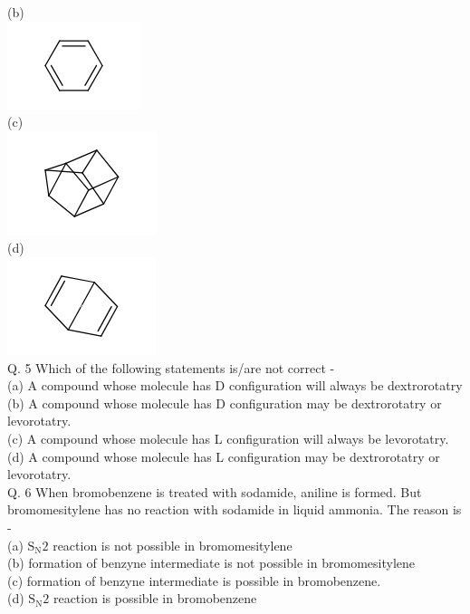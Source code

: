 \documentclass[10pt]{article}
\begin{document}
(b)\\
\includegraphics{smile-a142506640dac4d3b623ee5540378983b722428e}\\
(c)\\
\includegraphics{smile-f6da91316992e5c989784bb7ba5638197f015cc5}\\
(d)\\
\includegraphics{smile-54c9bfd68b31f2ae6d7a72a6af3272c4bb774853}\\
Q. 5 Which of the following statements is/are not correct -\\
(a) A compound whose molecule has D configuration will always be dextrorotatry\\
(b) A compound whose molecule has D configuration may be dextrorotatry or levorotatry.\\
(c) A compound whose molecule has L configuration will always be levorotatry.\\
(d) A compound whose molecule has L configuration may be dextrorotatry or levorotatry.\\
Q. 6 When bromobenzene is treated with sodamide, aniline is formed. But bromomesitylene has no reaction with sodamide in liquid ammonia. The reason is -\\
(a) $\mathrm{S}_{\mathrm{N}} 2$ reaction is not possible in bromomesitylene\\
(b) formation of benzyne intermediate is not possible in bromomesitylene\\
(c) formation of benzyne intermediate is possible in bromobenzene.\\
(d) $\mathrm{S}_{\mathrm{N}} 2$ reaction is possible in bromobenzene\\
\end{document}
